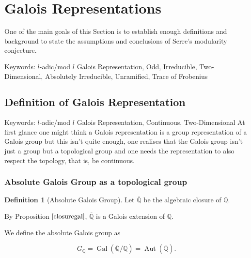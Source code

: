 \documentclass{article}
\theoremstyle{definition}
\newtheorem{definition}{Definition}[section]
\theoremstyle{definition}
\theoremstyle{definition}
\newtheorem{eg}{Example}[section]
\newcommand{\Gal}{\operatorname{Gal}}
\newcommand{\Aut}{\operatorname{Aut}}
\newcommand{\Q}{\mathbb{Q}}
\begin{document}
\section{Galois Representations}

One of the main goals of this Section is to establish enough definitions and background to state the assumptions and conclusions of Serre's modularity conjecture.

Keywords: $l$-adic/mod $l$ Galois Representation, Odd, Irreducible, Two-Dimensional, Absolutely Irreducible, Unramified, Trace of Frobenius





\subsection{Definition of Galois Representation}

Keywords: $l$-adic/mod $l$ Galois Representation, Continuous, Two-Dimensional
\newline\newline
At first glance one might think a Galois representation is a group representation of a Galois group but this isn't quite enough, one realises that the Galois group isn't just a group but a topological group and one needs the representation to also respect the topology, that is, be continuous.

\subsubsection{Absolute Galois Group as a topological group}

\begin{definition}[Absolute Galois Group]
Let $\overline{\Q}$ be the algebraic closure of $\Q$. 


By Proposition $\ref{closuregal}$, $\overline{ \mathbb{Q}}$ is a Galois extension of $\Q$. 

We define the absolute Galois group as

    $$G_\Q=\Gal(\overline{ \mathbb{Q}}/\mathbb{Q})=\Aut(\overline{ \mathbb{Q}}).$$
\end{definition}
    
\end{document}
